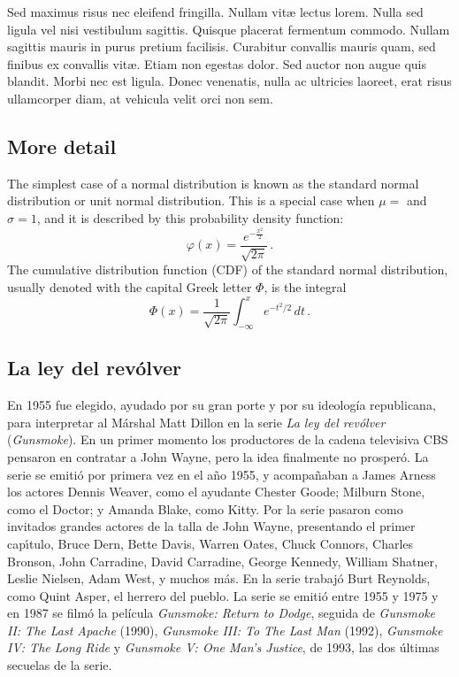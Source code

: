 \documentclass[11pt]{article} %
\begin{document}
Sed maximus risus nec eleifend fringilla. Nullam vit{\ae} lectus lorem. Nulla sed ligula vel nisi vestibulum sagittis. Quisque placerat fermentum commodo. Nullam sagittis mauris in purus pretium facilisis. Curabitur convallis mauris quam, sed finibus ex convallis vit{\ae}. Etiam non egestas dolor. Sed auctor non augue quis blandit. Morbi nec est ligula. Donec venenatis, nulla ac ultricies laoreet, erat risus ullamcorper diam, at vehicula velit orci non sem.

\subsection{More detail}

The simplest case of a normal distribution is known as the standard normal distribution or unit normal distribution. This is a special case when $\mu =$  and $\sigma = 1$, and it is described by this probability density function:
$$
    \varphi( x ) = \frac{
     \displaystyle e^{- \frac{ x^2}{2}}
     }{
      \displaystyle \sqrt{2 \pi}
     }\, .
$$
The cumulative distribution function (CDF) of the standard normal distribution, usually denoted with the capital Greek letter $\Phi$, is the integral
$$
 \Phi(x) = \frac{1}{\sqrt{2\pi}} \int_{-\infty}^x \! e^{-t^2\!/2}\, dt\, .
$$

 \subsection{La ley del rev\'{o}lver}
 
En  1955 fue elegido, ayudado por su gran porte y por su ideología republicana, para interpretar al M\'{a}rshal Matt Dillon en la serie \textit{La ley del rev\'{o}lver} (\textit{Gunsmoke}).
En un primer momento los productores de la cadena televisiva CBS pensaron en contratar a John Wayne, pero la idea finalmente no prosper\'{o}. La serie se emiti\'{o} por primera vez en el a\~{n}o 1955, y acompa\~{n}aban a James Arness los actores Dennis Weaver, como el ayudante Chester Goode; Milburn Stone, como el Doctor; y Amanda Blake, como Kitty. Por la serie pasaron como invitados grandes actores de la talla de John Wayne, presentando el primer cap\'{\i}tulo, Bruce Dern, Bette Davis, Warren Oates, Chuck Connors, Charles Bronson, John Carradine, David Carradine, George Kennedy, William Shatner, Leslie Nielsen, Adam West, y muchos m\'{a}s.
En la serie trabaj\'{o} Burt Reynolds, como Quint Asper, el herrero del pueblo.
La serie se emiti\'{o} entre 1955 y 1975 y en 1987 se film\'{o} la película \textit{Gunsmoke: Return to Dodge}, seguida de \textit{Gunsmoke II: The Last Apache} (1990), \textit{Gunsmoke III: To The Last Man} (1992), \textit{Gunsmoke IV: The Long Ride} y \textit{Gunsmoke V: One Man's Justice}, de 1993, las dos \'{u}ltimas secuelas de la serie. 
\end{document}
